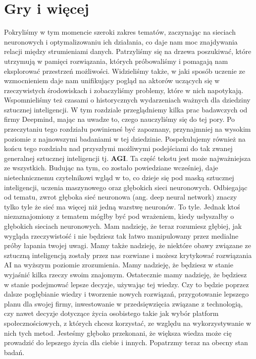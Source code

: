 \chapter{Gry i więcej}
\label{chap:games}

Pokryliśmy w tym momencie szeroki zakres tematów, zaczynając na sieciach neuronowych i optymalizowaniu ich działania, co daje nam moc znajdywania relacji między strumieniami danych. Patrzyliśmy się na drzewa poszukiwać, które utrzymują w pamięci rozwiązania, których próbowaliśmy i pomagają nam eksplorować przestrzeń możliwości. Widzieliśmy także, w jaki sposób uczenie ze wzmocnieniem daje nam unifikujący pogląd na aktorów uczących się w rzeczywistych środowiskach i zobaczyliśmy problemy, które w nich napotykają. Wspomnieliśmy też czasami o historycznych wydarzeniach ważnych dla dziedziny sztucznej inteligencji. W tym rozdziale przeglądniemy kilka prac badawczych od firmy Deepmind, mając na uwadze to, czego nauczyliśmy się do tej pory. Po przeczytaniu tego rozdziału powinieneś być zapoznany, przynajmniej na wysokim poziomie z najnowszymi badaniami w tej dziedzinie. Pospekulujemy również na końcu tego rozdziału nad przyszłymi możliwymi podejściami do tak zwanej generalnej sztucznej inteligencji tj. \textbf{AGI}. Ta część tekstu jest może najważniejsza ze wszystkich. Budując na tym, co zostało powiedziane wcześniej, daje nietechnicznemu czytelnikowi wgląd w to, co dzieje się pod maską sztucznej inteligencji, uczenia maszynowego oraz głębokich sieci neuronowych. Odbiegając od tematu, zwrot głęboka sieć neuronowa (ang. deep neural network) znaczy tylko tyle że sieć ma więcej niż jedną warstwę neuronów. To tyle. Jednak ktoś niezaznajomiony z tematem mógłby być pod wrażeniem, kiedy usłyszałby o głębokich sieciach neuronowych. Mam nadzieję, że teraz rozumiesz głębiej, jak wygląda rzeczywistość i nie będziesz tak łatwo manipulowany przez medialne próby łapania twojej uwagi. Mamy także nadzieję, że niektóre obawy związane ze sztuczną inteligencją zostały przez nas rozwiane i możesz krytykować rozwiązania AI na wyższym poziomie zrozumienia. Mamy nadzieję, że będziesz w stanie wyjaśnić kilka rzeczy swoim znajomym. Ostatecznie mamy nadzieję, że będziesz w stanie podejmować lepsze decyzje, używając tej wiedzy. Czy to będzie poprzez dalsze pogłębianie wiedzy i tworzenie nowych rozwiązań, przygotowanie lepszego planu dla swojej firmy, inwestowanie w przedsięwzięcia związane z technologią, czy nawet decyzje dotyczące życia osobistego takie jak wybór platform społecznościowych, z których chcesz korzystać, ze względu na wykorzystywanie w nich tych metod. Jesteśmy głęboko przekonani, że większa wiedza może cię prowadzić do lepszego życia dla ciebie i innych. Popatrzmy teraz na obecny stan badań.

